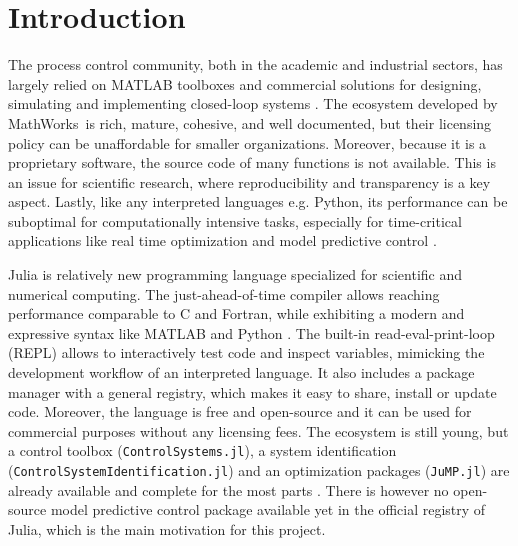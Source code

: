\section{Introduction}

The process control community, both in the academic and industrial sectors, has largely relied on MATLAB toolboxes and commercial solutions for designing, simulating and implementing closed-loop systems \citep{mpcSurvey, optimMatlab}. The ecosystem developed by MathWorks\texttrademark\ is rich, mature, cohesive, and well documented, but their licensing policy can be unaffordable for smaller organizations. Moreover, because it is a proprietary software, the source code of many functions is not available. This is an issue for scientific research, where reproducibility and transparency is a key aspect. Lastly, like any interpreted languages e.g. Python, its performance can be suboptimal for computationally intensive tasks, especially for time-critical applications like real time optimization and model predictive control \citep{matlabPythonJulia, juliaML}.

Julia is relatively new programming language specialized for scientific and numerical computing. The just-ahead-of-time compiler allows reaching performance comparable to C and Fortran, while exhibiting a modern and expressive syntax like MATLAB and Python \citep{juliaPaper}. The built-in read-eval-print-loop (REPL) allows to interactively test code and inspect variables, mimicking the development workflow of an interpreted language. It also includes a package manager with a general registry, which makes it easy to share, install or update code. Moreover, the language is free and open-source and it can be used for commercial purposes without any licensing fees. The ecosystem is still young, but a control toolbox (\texttt{ControlSystems.jl}), a system identification (\texttt{ControlSystemIdentification.jl}) and an optimization packages (\texttt{JuMP.jl}) are already available and complete for the most parts \citep{controlsystems, jump}. There is however no open-source model predictive control package available yet in the official registry of Julia, which is the main motivation for this project.

